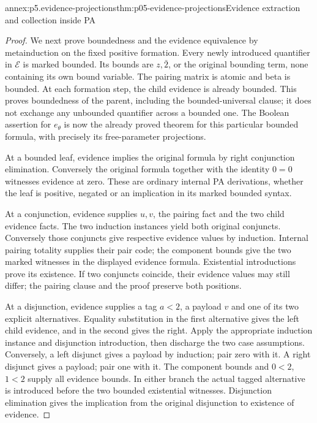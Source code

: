 \begin{annexitem}{annex:p5.evidence-projections}{thm:p05-evidence-projections}{Evidence extraction and collection inside PA}
\begin{proof}
We next prove boundedness and the evidence equivalence by metainduction on
the fixed positive formation. Every newly introduced quantifier in
\(\mathcal E\) is marked bounded. Its bounds are \(z,\bar2\),
or the original bounding term, none containing its own bound variable.
The pairing matrix is atomic and beta is bounded. At each formation step,
the child evidence is already bounded. This proves boundedness of the
parent, including the bounded-universal clause; it does not exchange any
unbounded quantifier across a bounded one. The Boolean assertion for
\(e_\theta\) is now the already proved theorem for this particular
bounded formula, with precisely its free-parameter projections.

At a bounded leaf, evidence implies the original formula by right
conjunction elimination. Conversely the original formula together with
the identity \(0=0\) witnesses evidence at zero. These are ordinary
internal PA derivations, whether the leaf is positive, negated or an
implication in its marked bounded syntax.

At a conjunction, evidence supplies \(u,v\), the pairing fact and
the two child evidence facts. The two induction instances yield both
original conjuncts. Conversely those conjuncts give respective evidence
values by induction. Internal pairing totality supplies their pair code;
the component bounds give the two marked witnesses in the displayed
evidence formula. Existential introductions prove its existence. If two
conjuncts coincide, their evidence values may still differ; the pairing
clause and the proof preserve both positions.

At a disjunction, evidence supplies a tag \(a<2\), a payload \(v\)
and one of its two explicit alternatives. Equality substitution in the
first alternative gives the left child evidence, and in the second gives
the right. Apply the appropriate induction instance and disjunction
introduction, then discharge the two case assumptions. Conversely, a left
disjunct gives a payload by induction; pair zero with it. A right disjunct
gives a payload; pair one with it. The component bounds and \(0<2\),
\(1<2\) supply all evidence bounds. In either branch the actual
tagged alternative is introduced before the two bounded existential
witnesses. Disjunction elimination gives the implication from the original
disjunction to existence of evidence.


\end{proof}
\end{annexitem}
